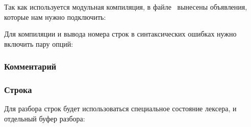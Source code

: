 \label{bilex}

Так как используется модульная компиляция, в файле \ вынесены
объявления, которые нам нужно подключить: 


Для компиляции и вывода номера строк в синтаксических ошибках
нужно включить пару опций:
 

\subsubsection{Комментарий}


\subsubsection{Строка}\label{lexstring}

Для разбора строк будет использоваться специальное состояние лексера,
и отдельный буфер разбора:  

